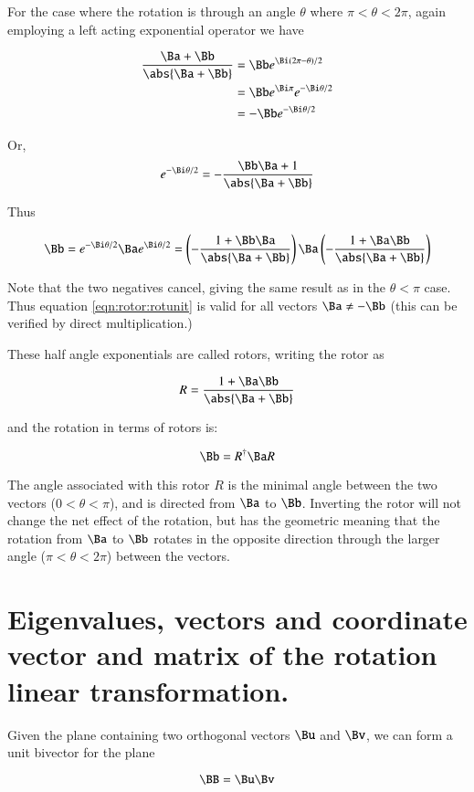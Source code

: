 For the case where the rotation is through an angle $\theta$ where $\pi < \theta < 2\pi$, again employing a left acting
exponential operator we have

\begin{align*}
\frac{\Ba + \Bb}{\abs{\Ba + \Bb}} 
&= \Bb e^{\Bi(2\pi - \theta)/2} \\
&= \Bb e^{\Bi \pi} e^{- \Bi\theta/2} \\
&= -\Bb e^{- \Bi\theta/2} \\
\end{align*}

Or,
\[
e^{- \Bi\theta/2} = -\frac{\Bb\Ba + 1}{\abs{\Ba + \Bb}} 
\]

Thus 

\begin{equation}\label{eqn:rotor:rotunit}
\Bb = e^{- \Bi\theta/2} \Ba e^{ \Bi\theta/2} =
\left(-\frac{1 + \Bb\Ba}{\abs{\Ba + \Bb}}\right) \Ba \left(-\frac{1 + \Ba\Bb}{\abs{\Ba + \Bb}}\right)
\end{equation}

Note that the two negatives cancel, giving the same result as in the $\theta < \pi$ case.  Thus equation \ref{eqn:rotor:rotunit} is valid for all vectors $\Ba \ne -\Bb$ (this can be verified by direct multiplication.)

These
half angle exponentials are called rotors, writing the rotor as

\[
R = \frac{1 + \Ba\Bb}{\abs{\Ba + \Bb}}
\]

and the rotation in terms of rotors is:

\[
\Bb = R^\dagger \Ba R
\]

The angle associated with this rotor $R$ is the minimal angle between the two vectors ($0 < \theta < \pi$), and is directed from $\Ba$ to $\Bb$.  Inverting the rotor will not change the net effect of the rotation, but has the geometric meaning that the rotation from $\Ba$ to $\Bb$ 
rotates in the opposite direction through the larger angle ($\pi < \theta < 2\pi$) between the vectors.

\section{Eigenvalues, vectors and coordinate vector and matrix of the rotation linear transformation. }

Given the plane containing two orthogonal vectors $\Bu$ and $\Bv$, we can form a unit bivector for the plane

\[
\BB = \Bu\Bv
\]

